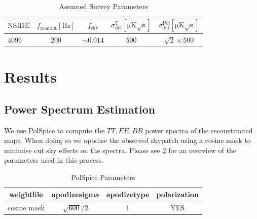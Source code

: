 \documentclass[apj]{emulateapj}
\begin{document}
\begin{table}[tbh]
\begin{center}
\caption{\label{tab:modelparams} Assumed Survey Parameters}
\small
\begin{tabular}{l c c c c}
$\mathrm{NSIDE}$ & $f_{\mathrm{readout}} [\mathrm{Hz}]$ & $f_{{\mathrm{sky}}}$ & $\sigma^{\mathrm{T}}_{\mathrm{det}} [\mathrm{\mu K \sqrt{s}}]$ & $\sigma^{\mathrm{Pol}}_{\mathrm{det}} [\mathrm{\mu K \sqrt{s}}]$\\
\hline
$4096$ & $200$ & $\sim 0.014$ & $500$ & $\sqrt{2}\times500$\\

\end{tabular}
 \normalsize
\end{center}
\end{table}



\section{Results}
\label{sec:results}

\subsection{Power Spectrum Estimation}
\label{subsec:psestimation}

We use PolSpice to compute the $TT, EE, BB$ power spectra of the reconstructed maps. When doing so we apodise the observed skypatch using a cosine mask to minimise cut sky effects on the spectra. Please see \ref{tab:polspiceparams} for an overview of the parameters used in this process.

\begin{table}[tbh]
\begin{center}
\caption{\label{tab:polspiceparams} PolSpice Parameters}
\small
\begin{tabular}{c c c c}
weightfile & apodizesigma & apodizetype & polarization \\
\hline
cosine mask & $\sqrt{600}/2$ & 1 & YES \\

\end{tabular}
 \normalsize
\end{center}
\end{table}
\end{document}
